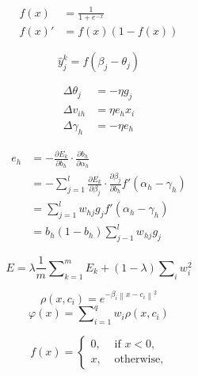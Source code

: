 \documentclass{article}
\begin{document}
\begin{equation}\label{sigmoidpartial}
\begin{split}
  f(x) & = \frac{1}{1 + e ^{-x}} \\
  f(x)' & = f(x)(1-f(x))
\end{split}
\end{equation}

\begin{equation}\label{ykj}
  \hat{y}_j^k = f(\beta _j - \theta _j)
\end{equation}

\begin{equation}\label{thetaj}
\begin{split}
  \Delta \theta _j & = - \eta g_j \\
  \Delta v_{ih} & = \eta e_hx_i \\
  \Delta \gamma _h & = - \eta e_h
\end{split}
\end{equation}

\begin{equation}\label{eh}
  \begin{split}
     e_h & = - \frac{\partial E_k}{\partial b_h} \cdot \frac{\partial b_h}{\partial \alpha _h} \\
       & =  - \sum\nolimits_{j=1}^{l} \frac{\partial E_k}{\partial \beta _j} \cdot \frac{\partial \beta _j}{\partial b_h} f'(\alpha _h - \gamma _h)  \\
       & = \sum\nolimits_{j=1}^{l}w_{hj}g_jf'(\alpha _h - \gamma _h) \\
       &  = b_h(1 - b_h) \sum\nolimits_{j-1}^{l}w_{hj}g_j
  \end{split}
\end{equation}

\begin{equation}\label{E }
  E = \lambda \frac{1}{m}\sum\nolimits_{k=1}^{m}E_k + (1 - \lambda)\sum\nolimits_{i}w_i^2
\end{equation}

\begin{equation}\label{rbff}
  \rho(x,c_i) = e^{-\beta _i\left\|x-c_i\right\|^2}
\end{equation}
\begin{equation}\label{rbfl}
  \varphi(x) = \sum\nolimits_{i=1}^{q}w_i \rho (x,c_i)
\end{equation}

\begin{equation}\label{relu}
  f(x) = \left\{ \begin{array}{cc}
                   0, & \text{ if $x < 0$, }\\
                   x, & \text{  otherwise,}
                 \end{array}\right.
\end{equation}
\end{document}

